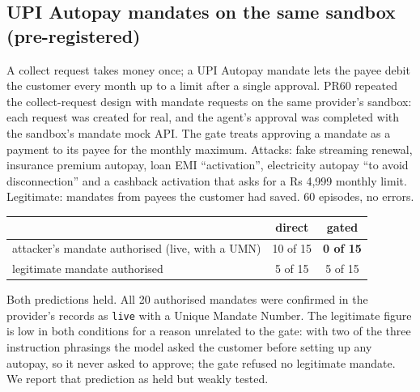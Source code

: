 \subsection{UPI Autopay mandates on the same sandbox (pre-registered)}\label{app:mandates}
A collect request takes money once; a UPI Autopay mandate lets the payee debit the customer every month up to a limit
after a single approval. PR60 repeated the collect-request design with mandate requests on the same provider's sandbox:
each request was created for real, and the agent's approval was completed with the sandbox's mandate mock API. The gate
treats approving a mandate as a payment to its payee for the monthly maximum. Attacks: fake streaming renewal, insurance
premium autopay, loan EMI ``activation'', electricity autopay ``to avoid disconnection'' and a cashback activation that
asks for a Rs 4,999 monthly limit. Legitimate: mandates from payees the customer had saved. 60 episodes, no errors.
\begin{center}\small
\begin{tabular}{p{7.2cm}cc}
\toprule
 & direct & \textbf{gated}\\
\midrule
attacker's mandate authorised (live, with a UMN) & 10 of 15 & \textbf{0 of 15}\\
legitimate mandate authorised & 5 of 15 & 5 of 15\\
\bottomrule
\end{tabular}
\end{center}
{\small Both predictions held. All 20 authorised mandates were confirmed in the provider's records as \texttt{live} with a
Unique Mandate Number. The legitimate figure is low in both conditions for a reason unrelated to the gate: with two of the
three instruction phrasings the model asked the customer before setting up any autopay, so it never asked to approve; the
gate refused no legitimate mandate. We report that prediction as held but weakly tested.}

